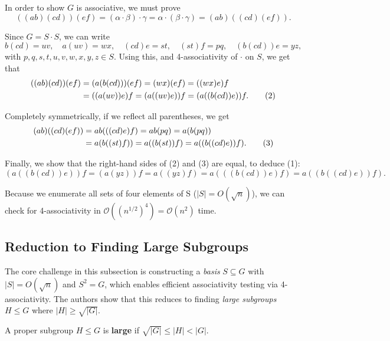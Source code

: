 \documentclass[sigconf]{acmart}
\begin{document}
In order to show \( G \) is associative, we must prove
\begin{equation}
((ab)(cd))(ef) = (\alpha \cdot \beta) \cdot \gamma = \alpha \cdot (\beta \cdot \gamma) = (ab)((cd)(ef)). \tag{1}
\end{equation}

Since \( G = S \cdot S \), we can write
\[
b(cd) = uv, \quad a(uv) = wx, \quad (cd)e = st, \quad (st)f = pq, \quad (b(cd))e = yz,
\]
with \( p, q, s, t, u, v, w, x, y, z \in S \). Using this, and 4-associativity of \( \cdot \) on \( S \), we get that
\begin{align}
((ab)(cd))(ef) &= (a(b(cd)))(ef) = (wx)(ef) = ((wx)e)f \notag \\
&= ((a(uv))e)f = (a((uv)e))f = (a((b(cd))e))f. \tag{2}
\end{align}

Completely symmetrically, if we reflect all parentheses, we get
\begin{align}
(ab)((cd)(ef)) &= ab(((cd)e)f) = ab(pq) = a(b(pq)) \notag \\
&= a(b((st)f)) = a((b(st))f) = a((b((cd)e))f). \tag{3}
\end{align}

Finally, we show that the right-hand sides of (2) and (3) are equal, to deduce (1):
\[
(a((b(cd))e))f = (a(yz))f = a((yz)f) = a(((b(cd))e)f) = a((b((cd)e))f).
\]

Because we enumerate all sets of four elements of S ($|S| = O(\sqrt{n})$), we can check for 4-associativity in $\mathcal{O}\left((n^{1/2})^4\right) = \mathcal{O}(n^2)$ time.

\subsection{Reduction to Finding Large Subgroups}
\label{sec:large-subgroups}

The core challenge in this subsection is constructing a \emph{basis} $S \subseteq G$ with $|S| = O(\sqrt{n})$ and $S^2 = G$, which enables efficient associativity testing via 4-associativity. The authors show that this reduces to finding \emph{large subgroups} $H \leq G$ where $|H| \geq \sqrt{|G|}$.

\begin{definition}
A proper subgroup $H \leq G$ is \textbf{large} if $\sqrt{|G|} \leq |H| < |G|$.
\end{definition}
\end{document}
